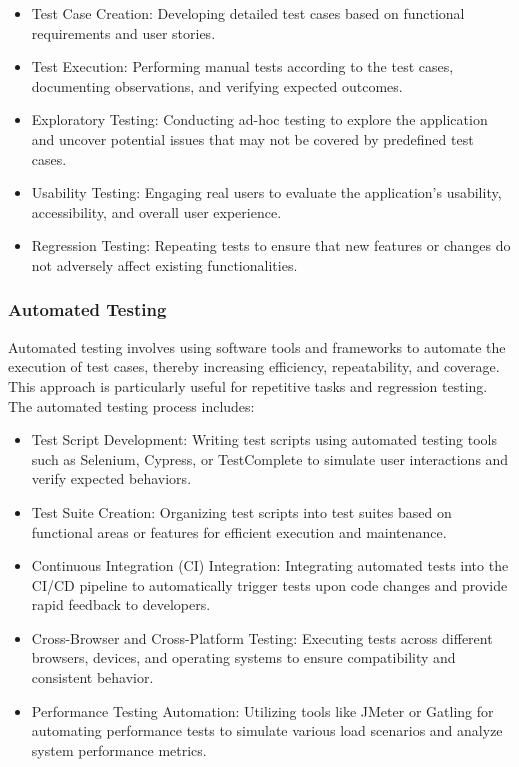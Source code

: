 		\begin{itemize}
			\item Test Case Creation: Developing detailed test cases based on functional requirements and user stories.
			\item Test Execution: Performing manual tests according to the test cases, documenting observations, and verifying expected outcomes.
			\item Exploratory Testing: Conducting ad-hoc testing to explore the application and uncover potential issues that may not be covered by predefined test cases.
			\item Usability Testing: Engaging real users to evaluate the application's usability, accessibility, and overall user experience.
			\item Regression Testing: Repeating tests to ensure that new features or changes do not adversely affect existing functionalities.
		\end{itemize}
		
		\subsubsection{Automated Testing}
		
		Automated testing involves using software tools and frameworks to automate the execution of test cases, thereby increasing efficiency, repeatability, and coverage. This approach is particularly useful for repetitive tasks and regression testing. The automated testing process includes:
		
		\begin{itemize}
			\item Test Script Development: Writing test scripts using automated testing tools such as Selenium, Cypress, or TestComplete to simulate user interactions and verify expected behaviors.
			\item Test Suite Creation: Organizing test scripts into test suites based on functional areas or features for efficient execution and maintenance.
			\item Continuous Integration (CI) Integration: Integrating automated tests into the CI/CD pipeline to automatically trigger tests upon code changes and provide rapid feedback to developers.
			\item Cross-Browser and Cross-Platform Testing: Executing tests across different browsers, devices, and operating systems to ensure compatibility and consistent behavior.
			\item Performance Testing Automation: Utilizing tools like JMeter or Gatling for automating performance tests to simulate various load scenarios and analyze system performance metrics.
		\end{itemize}
		

